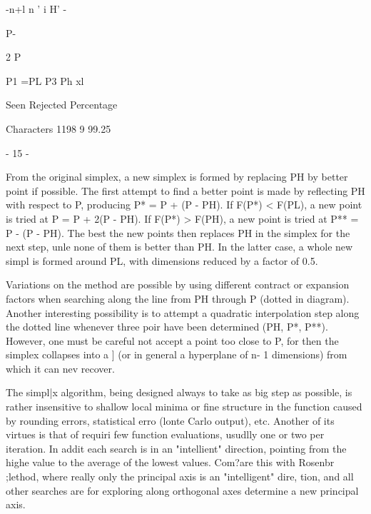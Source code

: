  
                                 -n+l
                               n '   i    H' -
 
 
 
                                                                P-
 
 
 
                   2  P 
 
 
 
 
 
                             P1 =PL
                   P3 Ph
                                             xl
 
                 Seen Rejected  Percentage
 
Characters       1198        9   99.25
 
                                 - 15 -
 
 
From the original simplex, a new simplex is formed by replacing PH by
better point if possible.  The first attempt to find a better point is
made by reflecting PH with respect to P, producing P* = P + (P - PH).
If F(P*) < F(PL), a new point is tried at P   = P + 2(P - PH).  If
F(P*) > F(PH), a new point is tried at P** = P - (P - PH).  The best
the new points then replaces PH in the simplex for the next step, unle
none of them is better than PH.  In the latter case, a whole new simpl
is formed around PL, with dimensions reduced by a factor of 0.5.
 
     Variations on the method are possible by using different contract
or expansion factors when searching along the line from PH through P
(dotted in diagram).  Another interesting possibility is to attempt a
quadratic interpolation step along the dotted line whenever three poir
have been determined (PH, P*, P**).  However, one must be careful not
accept a point too close to P, for then the simplex collapses into a ]
(or in general a hyperplane of n- 1 dimensions) from which it can nev
recover.
 
     The simpl|x algorithm, being designed always to take as big step
as possible, is rather insensitive to shallow local minima or fine
structure in the function caused by rounding errors, statistical erro
(lonte Carlo output), etc.  Another of its virtues is that of requiri
few function evaluations, usudlly one or two per iteration.  In addit
each search is in an "intellient" direction, pointing from the highe
value to the average of the lowest values.  Com?are this with Rosenbr
;lethod, where really only the principal axis is an "intelligent" dire,
tion, and all other searches are for exploring along orthogonal axes
determine a new principal axis.
 
